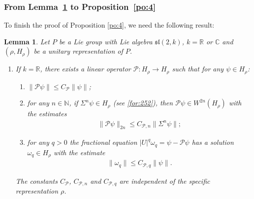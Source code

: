 \documentclass[11 pt]{amsart}
\newcommand{\NN}{\mathbb{N}}
\newcommand{\RR}{\mathbb{R}}
\newcommand{\CC}{\mathbb{C}}
\newcommand{\norm}[1]{\lVert#1\rVert}
\newtheorem{lemma}[theorem]{Lemma}
\theoremstyle{definition}
\numberwithin{equation}{section}
\begin{document}
\subsubsection{From Lemma~\ref{le:16} to Proposition~\ref{po:4}} To finish the proof of Proposition \ref{po:4}, we need the following result:
\begin{lemma}\label{le:16} Let $P$ be a Lie group with Lie algebra $\mathfrak{sl}(2,k)$, $k=\RR$ or $\CC$ and $(\rho,H_\rho)$ be a unitary representation of $P$.
\begin{enumerate}
  \item If $k=\RR$,  there exists a linear operator $\mathcal{P}:H_\rho\to H_\rho$
  such that for any $\psi\in H_\rho$:
\begin{enumerate}
  \item\label{for:24} $\norm{\mathcal{P}\psi}\leq C_{\mathcal{P}}\norm{\psi}$;
  \item\label{for:76} for any $n\in\NN$,  if $\Sigma^n\psi\in H_\rho$ (see \eqref{for:252}), then $\mathcal{P}\psi\in W^{2n}(H_\rho)$ with the estimates
  \begin{align*}
 \norm{\mathcal{P}\psi}_{2n}\leq C_{\mathcal{P},n}\big\|\Sigma^n\psi\big\|;
\end{align*}
 \item\label{for:77} for any $q>0$ the fractional equation $|U|^q\omega_q=\psi-\mathcal{P}\psi$ has a solution $\omega_q\in H_\rho$ with the estimate
 \begin{align*}
 \|\omega_q\|\leq C_{\mathcal{P},q}\norm{\psi}.
 \end{align*}
\end{enumerate}
The constants $C_{\mathcal{P}}$, $C_{\mathcal{P},n}$ and $C_{\mathcal{P},q}$ are independent of the specific representation $\rho$.


\end{enumerate}
\end{lemma}
\end{document}
